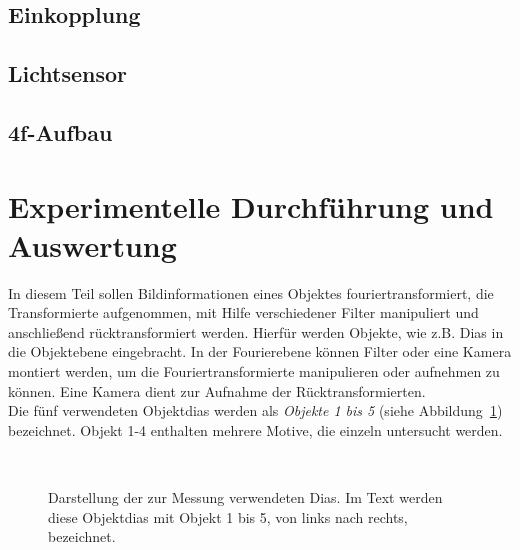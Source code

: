 \documentclass[12pt,a4paper]{article}
\begin{document}
	\subsection{Einkopplung}
	
	\subsection{Lichtsensor}
	
	\subsection{4f-Aufbau}
	
	\label{chap:abb+ft}
		
		
	\section{Experimentelle Durchführung und Auswertung}
	\label{chap:auswertung}
	In diesem Teil sollen Bildinformationen eines Objektes fouriertransformiert, die Transformierte aufgenommen, mit Hilfe verschiedener Filter manipuliert und anschließend rücktransformiert werden. Hierfür werden Objekte, wie z.B. Dias in die Objektebene eingebracht. In der Fourierebene können  Filter oder eine Kamera montiert werden, um die Fouriertransformierte manipulieren oder aufnehmen zu können. Eine Kamera dient zur Aufnahme der Rücktransformierten.\\
	
	Die fünf verwendeten Objektdias werden als \textit{Objekte 1 bis 5} (siehe Abbildung~\ref{fig:Objekte-aus-Anleitungsheft}) bezeichnet. Objekt 1-4 enthalten mehrere Motive, die einzeln untersucht werden.
	
	\begin{figure}[h]
		\centering
		~~
		~~
		~~
		~~
		\caption[Die zur Messung verwendeten Diamotive]{
			Darstellung der zur Messung verwendeten Dias. Im Text werden diese Objektdias mit Objekt 1 bis 5, von links nach rechts, bezeichnet.
		}
		\label{fig:Objekte-aus-Anleitungsheft}
	\end{figure}
	
\end{document}
